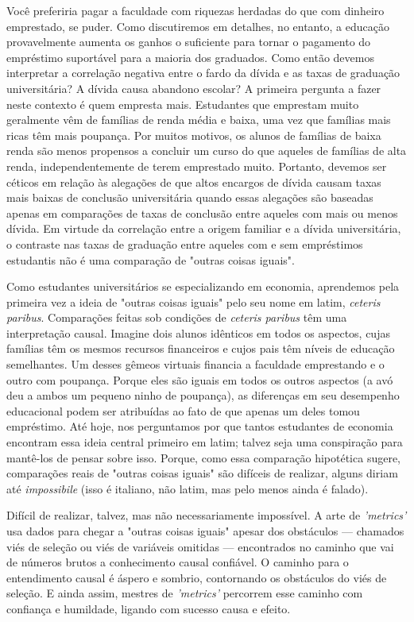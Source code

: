 \documentclass[a4paper,12pt]{article}[abntex2]
\begin{document}
Você preferiria pagar a faculdade com riquezas herdadas do que com dinheiro emprestado, se puder. Como discutiremos em detalhes, no entanto, a educação provavelmente aumenta os ganhos o suficiente para tornar o pagamento do empréstimo suportável para a maioria dos graduados. Como então devemos interpretar a correlação negativa entre o fardo da dívida e as taxas de graduação universitária? A dívida causa abandono escolar? A primeira pergunta a fazer neste contexto é quem empresta mais. Estudantes que emprestam muito geralmente vêm de famílias de renda média e baixa, uma vez que famílias mais ricas têm mais poupança. Por muitos motivos, os alunos de famílias de baixa renda são menos propensos a concluir um curso do que aqueles de famílias de alta renda, independentemente de terem emprestado muito. Portanto, devemos ser céticos em relação às alegações de que altos encargos de dívida causam taxas mais baixas de conclusão universitária quando essas alegações são baseadas apenas em comparações de taxas de conclusão entre aqueles com mais ou menos dívida. Em virtude da correlação entre a origem familiar e a dívida universitária, o contraste nas taxas de graduação entre aqueles com e sem empréstimos estudantis não é uma comparação de "outras coisas iguais".

Como estudantes universitários se especializando em economia, aprendemos pela primeira vez a ideia de "outras coisas iguais" pelo seu nome em latim, \emph{ceteris paribus}. Comparações feitas sob condições de \emph{ceteris paribus} têm uma interpretação causal. Imagine dois alunos idênticos em todos os aspectos, cujas famílias têm os mesmos recursos financeiros e cujos pais têm níveis de educação semelhantes. Um desses gêmeos virtuais financia a faculdade emprestando e o outro com poupança. Porque eles são iguais em todos os outros aspectos (a avó deu a ambos um pequeno ninho de poupança), as diferenças em seu desempenho educacional podem ser atribuídas ao fato de que apenas um deles tomou empréstimo. Até hoje, nos perguntamos por que tantos estudantes de economia encontram essa ideia central primeiro em latim; talvez seja uma conspiração para mantê-los de pensar sobre isso. Porque, como essa comparação hipotética sugere, comparações reais de "outras coisas iguais" são difíceis de realizar, alguns diriam até \emph{impossibile} (isso é italiano, não latim, mas pelo menos ainda é falado).

Difícil de realizar, talvez, mas não necessariamente impossível. A arte de \emph{'metrics'} usa dados para chegar a "outras coisas iguais" apesar dos obstáculos — chamados viés de seleção ou viés de variáveis omitidas — encontrados no caminho que vai de números brutos a conhecimento causal confiável. O caminho para o entendimento causal é áspero e sombrio, contornando os obstáculos do viés de seleção. E ainda assim, mestres de \emph{'metrics'} percorrem esse caminho com confiança e humildade, ligando com sucesso causa e efeito.
\end{document}
